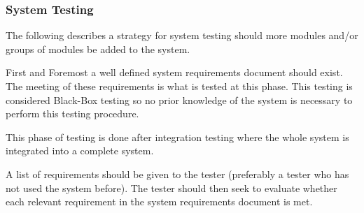 \documentclass[]{article}
\begin{document}
\subsubsection{System Testing}

The following describes a strategy for system testing should more modules and/or groups of modules be added to the system.

First and Foremost a well defined system requirements document should exist. The meeting of these requirements is what is tested at this phase. This testing is considered Black-Box testing so no prior knowledge of the system is necessary to perform this testing procedure.

This phase of testing is done after integration testing where the whole system is integrated into a complete system.

A list of requirements should be given to the tester (preferably a tester who has not used the system before). The tester should then seek to evaluate whether each relevant requirement in the system requirements document is met. 
\end{document}
